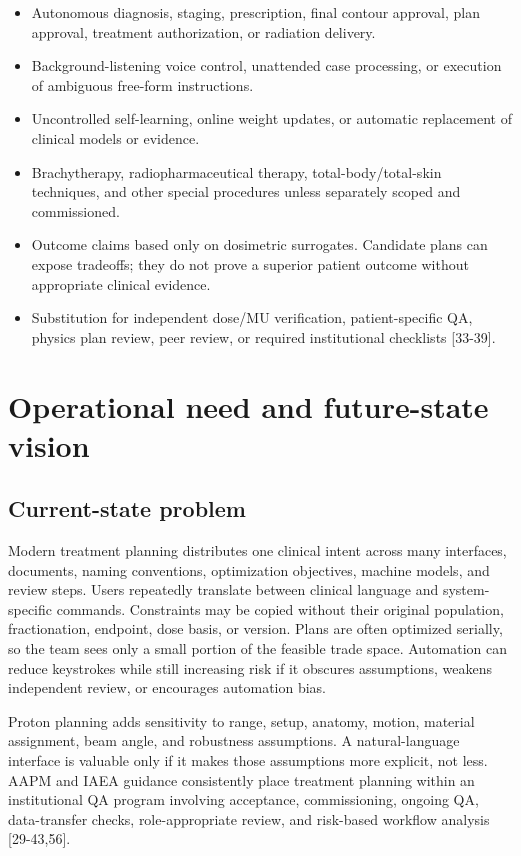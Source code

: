 \documentclass[11pt,letterpaper]{article}
\begin{document}
\begin{itemize}
\item Autonomous diagnosis, staging, prescription, final contour approval, plan approval, treatment authorization, or radiation delivery.
\item Background-listening voice control, unattended case processing, or execution of ambiguous free-form instructions.
\item Uncontrolled self-learning, online weight updates, or automatic replacement of clinical models or evidence.
\item Brachytherapy, radiopharmaceutical therapy, total-body\slash\allowbreak{}total-skin techniques, and other special procedures unless separately scoped and commissioned.
\item Outcome claims based only on dosimetric surrogates. Candidate plans can expose tradeoffs; they do not prove a superior patient outcome without appropriate clinical evidence.
\item Substitution for independent dose\slash\allowbreak{}MU verification, patient-specific QA, physics plan review, peer review, or required institutional checklists [33-39].
\end{itemize}

\section{Operational need and future-state vision}

\subsection{Current-state problem}

Modern treatment planning distributes one clinical intent across many interfaces, documents, naming conventions, optimization objectives, machine models, and review steps. Users repeatedly translate between clinical language and system-specific commands. Constraints may be copied without their original population, fractionation, endpoint, dose basis, or version. Plans are often optimized serially, so the team sees only a small portion of the feasible trade space. Automation can reduce keystrokes while still increasing risk if it obscures assumptions, weakens independent review, or encourages automation bias.

Proton planning adds sensitivity to range, setup, anatomy, motion, material assignment, beam angle, and robustness assumptions. A natural-language interface is valuable only if it makes those assumptions more explicit, not less. AAPM and IAEA guidance consistently place treatment planning within an institutional QA program involving acceptance, commissioning, ongoing QA, data-transfer checks, role-appropriate review, and risk-based workflow analysis [29-43,56].
\end{document}
